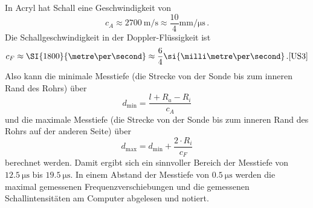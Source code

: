 In Acryl hat Schall eine Geschwindigkeit von 
\begin{equation*}
    c_A \approx \SI{2700}{\metre\per\second} \approx \frac{10}{4}\si{\milli\metre\per\micro\second} \, .
\end{equation*}
Die Schallgeschwindigkeit in der Doppler-Flüssigkeit ist
\begin{equation*}
    c_F \approx \SI{1800}{\metre\per\second} \approx \frac{6}{4}\si{\milli\metre\per\second} \, . \text{\cite{US3}}
\end{equation*}
Also kann die minimale Messtiefe (die Strecke von der Sonde bis zum inneren Rand des Rohrs) über
\begin{equation}
    d_\text{min} = \frac{l+R_a-R_i}{c_A}
    \label{eq:messtiefe_min}
\end{equation}
und die maximale Messtiefe (die Strecke von der Sonde bis zum inneren Rand des Rohrs auf der anderen Seite) über
\begin{equation}
    d_\text{max} = d_\text{min} + \frac{2 \cdot R_i}{c_F}
    \label{eq:messtiefe_max}
\end{equation}
berechnet werden.
Damit ergibt sich ein sinnvoller Bereich der Messtiefe von $\SI{12.5}{\micro\second}$ bis $\SI{19.5}{\micro\second}$.
In einem Abstand der Messtiefe von $\SI{0.5}{\micro\second}$ werden die maximal gemessenen Frequenzverschiebungen und die gemessenen Schallintensitäten am Computer abgelesen und notiert.